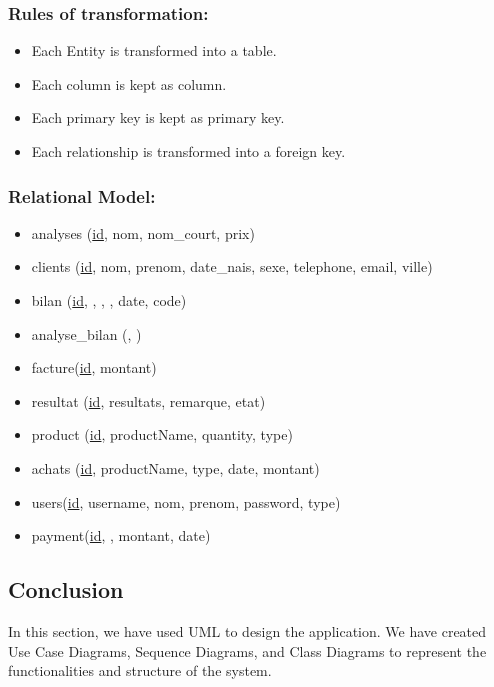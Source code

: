 \documentclass{article}
\begin{document}
\subsubsection*{Rules of transformation:}

\begin{itemize}
    \item Each Entity is transformed into a table.
    \item Each column is kept as column.
    \item Each primary key is kept as primary key.
    \item Each relationship is transformed into a foreign key.
\end{itemize}

\subsubsection*{Relational Model:}

\begin{itemize}
    \item analyses (\underline{id}, nom, nom\_court, prix)
    \item clients (\underline{id}, nom, prenom, date\_nais, sexe, telephone, email, ville)
    \item bilan (\underline{id}, , , , date, code)
    \item analyse\_bilan (, )
    \item facture(\underline{id}, montant)
    \item resultat (\underline{id}, resultats, remarque, etat)
    \item product (\underline{id}, productName, quantity, type)
    \item achats (\underline{id}, productName, type, date, montant)
    \item users(\underline{id}, username, nom, prenom, password, type)
    \item payment(\underline{id}, , montant, date)
    
\end{itemize}

\subsection[Conclusion]{Conclusion}
In this section, we have used UML to design the application. We have created Use Case Diagrams, Sequence Diagrams, and Class Diagrams to represent the functionalities and structure of the system. 
\end{document}
